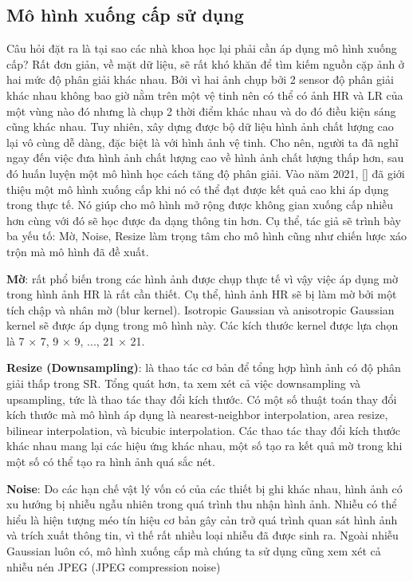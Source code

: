 \documentclass[conference]{IEEEtran}
\begin{document}
\subsection{Mô hình xuống cấp sử dụng} \label{sect:framework}
Câu hỏi đặt ra là tại sao các nhà khoa học lại phải cần áp dụng mô hình xuống cấp? Rất đơn giản, về mặt dữ liệu, sẽ rất khó khăn để tìm kiếm nguồn cặp ảnh ở hai mức độ phân giải khác nhau. Bởi vì hai ảnh chụp bởi 2 sensor độ phân giải khác nhau không bao giờ nằm trên một vệ tinh nên có thể có ảnh HR và LR của một vùng nào đó nhưng là chụp 2 thời điểm khác nhau và do đó điều kiện sáng cũng khác nhau. Tuy nhiên, xây dựng được bộ dữ liệu hình ảnh chất lượng cao lại vô cùng dễ dàng, đặc biệt là với hình ảnh vệ tinh. Cho nên, người ta đã nghĩ ngay đến việc đưa hình ảnh chất lượng cao về hình ảnh chất lượng thấp hơn, sau đó huấn luyện một mô hình học cách tăng độ phân giải. Vào năm 2021, [] đã giới thiệu một mô hình xuống cấp khi nó có thể đạt được kết quả cao khi áp dụng trong thực tế. Nó giúp cho mô hình mở rộng được không gian xuống cấp nhiều hơn cùng với đó sẽ học được đa dạng thông tin hơn. Cụ thể, tác giả sẽ trình bày ba yếu tố: Mờ, Noise, Resize làm trọng tâm cho mô hình cũng như chiến lược xáo trộn mà mô hình đã đề xuất.

\textbf{Mờ}: rất phổ biến trong các hình ảnh được chụp thực tế vì vậy việc áp dụng mờ trong hình ảnh HR là rất cần thiết. Cụ thể, hình ảnh HR sẽ bị làm mờ bởi một tích chập và nhân mờ (blur kernel). Isotropic Gaussian và anisotropic Gaussian kernel sẽ được áp dụng trong mô hình này. Các kích thước kernel được lựa chọn là 7 × 7, 9 × 9, ..., 21 × 21.

\textbf{Resize (Downsampling)}: là thao tác cơ bản để tổng hợp hình ảnh có độ phân giải thấp trong SR. Tổng quát hơn, ta xem xét cả việc downsampling và upsampling, tức là thao tác thay đổi kích thước. Có một số thuật toán thay đổi kích thước mà mô hình áp dụng là nearest-neighbor interpolation, area resize, bilinear interpolation, và bicubic interpolation. Các thao tác thay đổi kích thước khác nhau mang lại các hiệu ứng khác nhau, một số tạo ra kết quả mờ trong khi một số có thể tạo ra hình ảnh quá sắc nét.

\textbf{Noise}: Do các hạn chế vật lý vốn có của các thiết bị ghi khác nhau, hình ảnh có xu hướng bị nhiễu ngẫu nhiên trong quá trình thu nhận hình ảnh. Nhiễu có thể hiểu là hiện tượng méo tín hiệu cơ bản gây cản trở quá trình quan sát hình ảnh và trích xuất thông tin, vì thế rất nhiều loại nhiễu đã được sinh ra. Ngoài nhiễu Gaussian luôn có, mô hình xuống cấp mà chúng ta sử dụng cũng xem xét cả nhiễu nén JPEG (JPEG compression noise)
\end{document}
